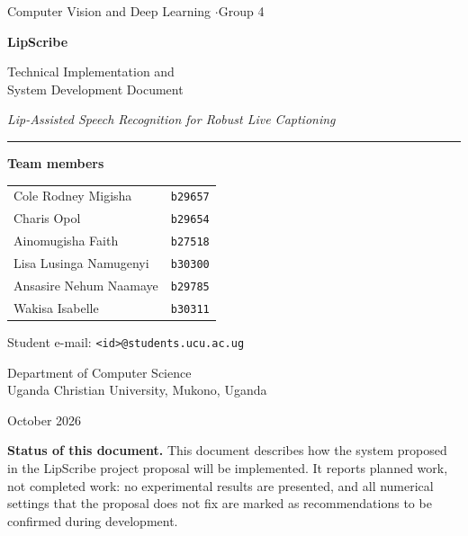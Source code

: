 \begin{titlepage}
\thispagestyle{empty}
\centering
\vspace*{1.2cm}

{\sffamily\large\color{lsgrey} Computer Vision and Deep Learning \quad$\cdot$\quad Group 4\par}
\vspace{1.6cm}

{\sffamily\bfseries\fontsize{30}{36}\selectfont\color{lsblue} LipScribe\par}
\vspace{0.4cm}
{\sffamily\Large Technical Implementation and\\[2pt] System Development Document\par}
\vspace{0.6cm}
{\itshape\large Lip-Assisted Speech Recognition for Robust Live Captioning\par}

\vspace{1.4cm}
{\color{lsblue}\rule{0.6\textwidth}{0.8pt}}
\vspace{1.0cm}

{\sffamily\bfseries Team members\par}
\vspace{0.3cm}
\begin{tabular}{ll}
Cole Rodney Migisha        & \texttt{b29657} \\
Charis Opol                & \texttt{b29654} \\
Ainomugisha Faith          & \texttt{b27518} \\
Lisa Lusinga Namugenyi     & \texttt{b30300} \\
Ansasire Nehum Naamaye     & \texttt{b29785} \\
Wakisa Isabelle            & \texttt{b30311} \\
\end{tabular}

\vspace{1.0cm}
{\small Student e-mail: \texttt{<id>@students.ucu.ac.ug}\par}

\vfill
{\sffamily Department of Computer Science\\
Uganda Christian University, Mukono, Uganda\par}
\vspace{0.5cm}
{\sffamily October 2026\par}
\vspace{0.6cm}

\begin{minipage}{0.86\textwidth}
\small\color{lsgrey}
\textbf{Status of this document.} This document describes how the system
proposed in the LipScribe project proposal will be implemented. It reports
planned work, not completed work: no experimental results are presented, and
all numerical settings that the proposal does not fix are marked as
recommendations to be confirmed during development.
\end{minipage}
\end{titlepage}

